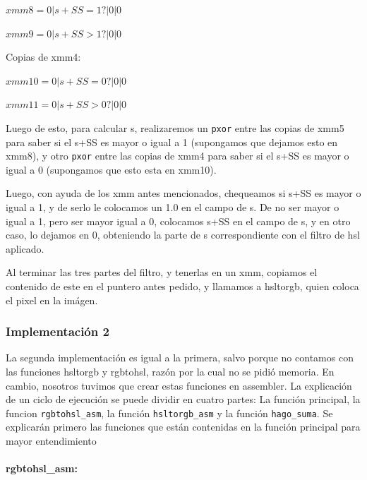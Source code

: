 \documentclass[a4paper]{article}
\begin{document}
$xmm8= 0 | s+SS = 1?| 0 | 0$

\vspace*{0.3cm} 

$xmm9=0 |s+SS > 1?| 0 | 0$

\vspace*{0.3cm}

Copias de xmm4:

\vspace*{0.3cm}

$xmm10= 0 |s+SS= 0?| 0 | 0$

\vspace*{0.3cm}

$xmm11= 0 |s+SS > 0?| 0 | 0$

\vspace*{0.3cm}

Luego de esto, para calcular s, realizaremos un {\tt pxor} entre las copias de xmm5 para saber si el s+SS es mayor o igual a 1 (supongamos que dejamos esto en xmm8), y otro {\tt pxor} entre las copias de xmm4 para saber si el s+SS es mayor o igual a 0 (supongamos que esto esta en xmm10).

Luego, con ayuda de los xmm antes mencionados, chequeamos si s+SS es mayor o igual a 1, y de serlo le colocamos un 1.0 en el campo de s. De no ser mayor o igual a 1, pero ser mayor igual a 0, colocamos s+SS en el campo de s, y en otro caso, lo dejamos en 0, obteniendo la parte de s correspondiente con el filtro de hsl aplicado. 

Al terminar las tres partes del filtro, y tenerlas en un xmm, copiamos el contenido de este en el puntero antes pedido, y llamamos a hsltorgb, quien coloca el pixel en la imágen.

\subsubsection{Implementación 2}
La segunda implementación es igual a la primera, salvo porque no contamos con las funciones hsltorgb y rgbtohsl, razón por la cual no se pidió memoria. En cambio, nosotros tuvimos que crear estas funciones en assembler. La explicación de un ciclo de ejecución se puede dividir en cuatro partes: La función principal, la funcion {\tt rgbtohsl\_asm}, la función {\tt hsltorgb\_asm} y la función {\tt hago\_suma}. Se explicarán primero las funciones que están contenidas en la función principal para mayor entendimiento

\paragraph*{rgbtohsl_asm:}
\end{document}
